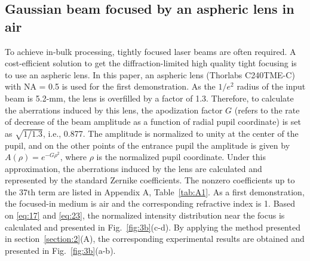 \documentclass[9pt,twocolumn,twoside]{osajnl}
\begin{document}
\subsection{Gaussian beam focused by an aspheric lens in air}
To achieve in-bulk processing, tightly focused laser beams are often required. A cost-efficient solution to get the diffraction-limited high quality tight focusing is to use an aspheric lens. %
In this paper, an aspheric lens (Thorlabs C240TME-C) with NA = 0.5 is used for the first demonstration. As the $1/e^2$ radius of the input beam is 5.2-mm, the lens is overfilled by a factor of 1.3. Therefore, to calculate the aberrations induced by this lens, the apodization factor $G$ (refers to the rate of decrease of the beam amplitude as a function of radial pupil coordinate) is set as $\sqrt{1/1.3}$, i.e., 0.877. The amplitude is normalized to unity at the center of the pupil, and on the other points of the entrance pupil the amplitude is given by $A(\rho)=e^{-G\rho^2}$, where $\rho$ is the normalized pupil coordinate. Under this approximation, the aberrations induced by the lens are calculated and represented by the standard Zernike coefficients. The nonzero coefficients up to the 37th term are listed in Appendix A, Table~\ref{tab:A1}. As a first demonstration, the focused-in medium is air and the corresponding refractive index is 1. Based on \eqref{eq:17} and \eqref{eq:23}, the normalized intensity distribution near the focus is calculated and presented in Fig.~\ref{fig:3b}(c-d). By applying the method presented in section~\ref{section:2}(A), the corresponding experimental results are obtained and presented in Fig.~\ref{fig:3b}(a-b).  
\end{document}
